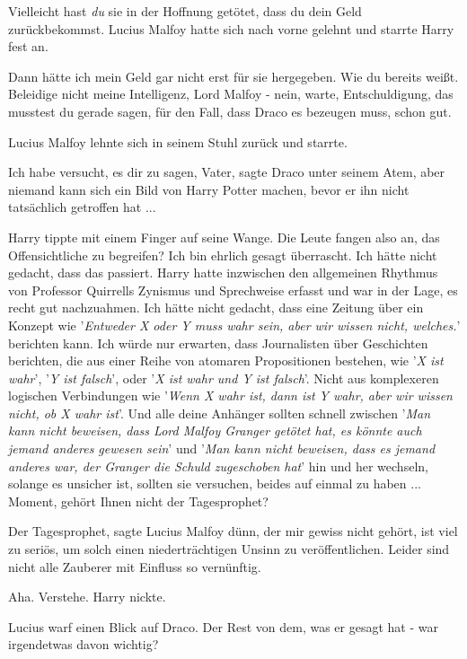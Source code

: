 \glqq{}Vielleicht hast \emph{du} sie in der Hoffnung getötet, dass du dein Geld
zurückbekommst.\grqq{} Lucius Malfoy hatte sich nach vorne gelehnt und starrte
Harry fest an.

\glqq{}Dann hätte ich mein Geld gar nicht erst für sie hergegeben. Wie du bereits
weißt. Beleidige nicht meine Intelligenz, Lord Malfoy - nein, warte,
Entschuldigung, das musstest du gerade sagen, für den Fall, dass Draco es
bezeugen muss, schon gut.\grqq{}

Lucius Malfoy lehnte sich in seinem Stuhl zurück und starrte.

\glqq{}Ich habe versucht, es dir zu sagen, Vater\grqq{}, sagte Draco unter seinem
Atem, \glqq{}aber niemand kann sich ein Bild von Harry Potter machen, bevor er
ihn nicht tatsächlich getroffen hat ...\grqq{}

Harry tippte mit einem Finger auf seine Wange. \glqq{}Die Leute fangen also an,
das Offensichtliche zu begreifen? Ich bin ehrlich gesagt überrascht. Ich hätte
nicht gedacht, dass das passiert.\grqq{} Harry hatte inzwischen den allgemeinen
Rhythmus von Professor Quirrells Zynismus und Sprechweise erfasst und war in der
Lage, es recht gut nachzuahmen. \glqq{}Ich hätte nicht gedacht, dass eine Zeitung
über ein Konzept wie '\emph{Entweder X oder Y muss wahr sein, aber wir wissen
nicht, welches.}' berichten kann. Ich würde nur erwarten, dass Journalisten über
Geschichten berichten, die aus einer Reihe von atomaren Propositionen bestehen,
wie '\emph{X ist wahr}', '\emph{Y ist falsch}', oder '\emph{X ist wahr und Y ist
falsch}'. Nicht aus komplexeren logischen Verbindungen wie '\emph{Wenn X wahr
ist, dann ist Y wahr, aber wir wissen nicht, ob X wahr ist}'. Und alle deine
Anhänger sollten schnell zwischen '\emph{Man kann nicht beweisen, dass Lord
Malfoy Granger getötet hat, es könnte auch jemand anderes gewesen sein}' und
'\emph{Man kann nicht beweisen, dass es jemand anderes war, der Granger die
Schuld zugeschoben hat}' hin und her wechseln, solange es unsicher ist, sollten
sie versuchen, beides auf einmal zu haben ... Moment, gehört Ihnen nicht der
Tagesprophet?\grqq{}

\glqq{}Der Tagesprophet\grqq{}, sagte Lucius Malfoy dünn, \glqq{}der mir gewiss
nicht gehört, ist viel zu seriös, um solch einen niederträchtigen Unsinn zu
veröffentlichen. Leider sind nicht alle Zauberer mit Einfluss so
vernünftig.\grqq{}

\glqq{}Aha. Verstehe.\grqq{} Harry nickte.

Lucius warf einen Blick auf Draco. \glqq{}Der Rest von dem, was er gesagt hat -
war irgendetwas davon wichtig?\grqq{}

